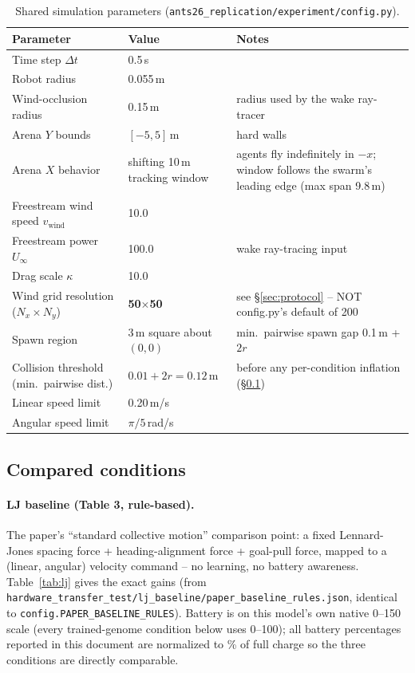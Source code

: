 \documentclass[11pt]{article}
\begin{document}
\begin{table}[h]
\centering
\caption{Shared simulation parameters (\texttt{ants26\_replication/experiment/config.py}).}
\label{tab:env}
\begin{tabular}{@{}llp{7cm}@{}}
\toprule
Parameter & Value & Notes \\
\midrule
Time step $\Delta t$ & 0.5\,s & \\
Robot radius & 0.055\,m & \\
Wind-occlusion radius & 0.15\,m & radius used by the wake ray-tracer \\
Arena $Y$ bounds & $[-5, 5]$\,m & hard walls \\
Arena $X$ behavior & shifting 10\,m tracking window & agents fly indefinitely in $-x$; window follows the swarm's leading edge (max span 9.8\,m) \\
Freestream wind speed $v_{\text{wind}}$ & 10.0 & \\
Freestream power $U_\infty$ & 100.0 & wake ray-tracing input \\
Drag scale $\kappa$ & 10.0 & \\
Wind grid resolution ($N_x{\times}N_y$) & \textbf{50$\times$50} & see \S\ref{sec:protocol} -- NOT config.py's default of 200 \\
Spawn region & 3\,m square about $(0,0)$ & min.\ pairwise spawn gap 0.1\,m + $2r$ \\
Collision threshold (min.\ pairwise dist.) & $0.01 + 2r = 0.12$\,m & before any per-condition inflation (\S\ref{sec:conditions}) \\
Linear speed limit & 0.20\,m/s & \\
Angular speed limit & $\pi/5$\,rad/s & \\
\bottomrule
\end{tabular}
\end{table}

\subsection{Compared conditions}
\label{sec:conditions}

\paragraph{LJ baseline (Table 3, rule-based).} The paper's ``standard collective motion''
comparison point: a fixed Lennard-Jones spacing force + heading-alignment force + goal-pull
force, mapped to a (linear, angular) velocity command -- no learning, no battery awareness.
Table~\ref{tab:lj} gives the exact gains (from
\texttt{hardware\_transfer\_test/lj\_baseline/paper\_baseline\_rules.json}, identical to
\texttt{config.PAPER\_BASELINE\_RULES}). Battery is on this model's own native 0--150 scale
(every trained-genome condition below uses 0--100); all battery percentages reported in this
document are normalized to \% of full charge so the three conditions are directly comparable.
\end{document}
